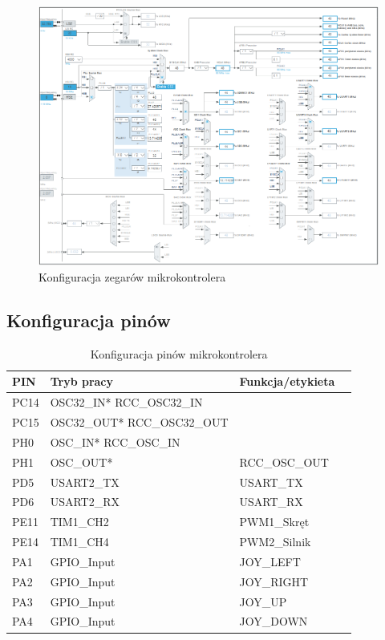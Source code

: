 \documentclass[10pt, a4paper]{article}
\begin{document}
\begin{figure}[H]
	\centering
	\includegraphics[width=0.9\textheight,angle=90]{figures/zegar.png}
	\caption{Konfiguracja zegarów mikrokontrolera}
	\label{fig:KonfiguracjaZegara}
\end{figure}
\subsection{Konfiguracja pinów}

\begin{table}[H]
	\centering
	\begin{tabular}{|l|l|l|l|}
		\hline
		PIN & Tryb pracy & Funkcja/etykieta\\
		\hline
			PC14 & OSC32\_IN*	RCC\_OSC32\_IN	&\\
			PC15 & OSC32\_OUT*	RCC\_OSC32\_OUT	&\\
			PH0&  OSC\_IN*	RCC\_OSC\_IN	&\\
			PH1&  OSC\_OUT*&		RCC\_OSC\_OUT	\\
			PD5&	USART2\_TX&	USART\_TX\\
			PD6&	USART2\_RX&	USART\_RX\\
			PE11&	TIM1\_CH2&	PWM1\_Skręt\\
			PE14&	TIM1\_CH4&	PWM2\_Silnik\\
			PA1&	GPIO\_Input&	JOY\_LEFT\\
			PA2&	GPIO\_Input&	JOY\_RIGHT\\
			PA3&	GPIO\_Input&	JOY\_UP\\
PA4& GPIO\_Input& JOY\_DOWN\\


		\hline
	\end{tabular}
	\caption{Konfiguracja pinów mikrokontrolera}
	
\end{table}
\end{document}
